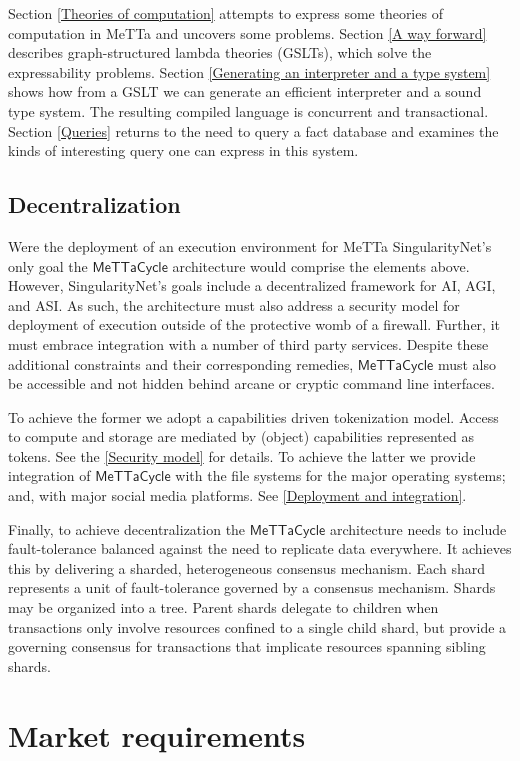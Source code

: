 \documentclass{article}
\newcommand{\MC}{\mathsf{MeTTaCycle}}
\begin{document}
Section \ref{Theories of computation} attempts to express some theories of computation in MeTTa and uncovers some problems.  Section \ref{A way forward} describes graph-structured lambda theories (GSLTs), which solve the expressability problems.  Section \ref{Generating an interpreter and a type system} shows how from a GSLT we can generate an efficient interpreter and a sound type system.  The resulting compiled language is concurrent and transactional. Section \ref{Queries} returns to the need to query a fact database and examines the kinds of interesting query one can express in this system.

\subsection{Decentralization}

Were the deployment of an execution environment for MeTTa SingularityNet's only goal the $\MC$ architecture would comprise the elements above. However, SingularityNet's goals include a decentralized framework for AI, AGI, and ASI. As such, the architecture must also address a security model for deployment of execution outside of the protective womb of a firewall. Further, it must embrace integration with a number of third party services. Despite these additional constraints and their corresponding remedies, $\MC$ must also be accessible and not hidden behind arcane or cryptic command line interfaces.

To achieve the former we adopt a capabilities driven tokenization model. Access to compute and storage are mediated by (object) capabilities represented as tokens. See the \ref{Security model} for details. To achieve the latter we provide integration of $\MC$ with the file systems for the major operating systems; and, with major social media platforms. See \ref{Deployment and integration}.

Finally, to achieve decentralization the $\MC$ architecture needs to include fault-tolerance balanced against the need to replicate data everywhere. It achieves this by delivering a sharded, heterogeneous consensus mechanism. Each shard represents a unit of fault-tolerance governed by a consensus mechanism. Shards may be organized into a tree. Parent shards delegate to children when transactions only involve resources confined to a single child shard, but provide a governing consensus for transactions that implicate resources spanning sibling shards.

\section{Market requirements}
\end{document}
